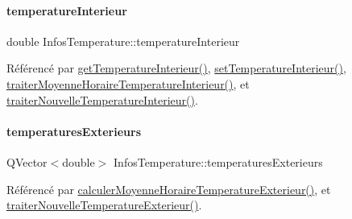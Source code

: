 \mbox{\label{class_infos_temperature_a976ab7ead7ac82b5b8572807d778689e}} 
\paragraph{\texorpdfstring{temperature\+Interieur}{temperatureInterieur}}
{\footnotesize\ttfamily double Infos\+Temperature\+::temperature\+Interieur\hspace{0.3cm}{\ttfamily [private]}}



Référencé par \hyperlink{class_infos_temperature_aaf4cb4fd8a7c46d14955d3175498f91c}{get\+Temperature\+Interieur()}, \hyperlink{class_infos_temperature_ac11ec6b1860f43dc989a02a7967497e7}{set\+Temperature\+Interieur()}, \hyperlink{class_infos_temperature_a0311c8ce5730388f3baef752920d5abf}{traiter\+Moyenne\+Horaire\+Temperature\+Interieur()}, et \hyperlink{class_infos_temperature_a547da18a7c04603d2f30eece061d9634}{traiter\+Nouvelle\+Temperature\+Interieur()}.

\mbox{\label{class_infos_temperature_a32b2a36e737ab4bf61fc8274990c2943}} 
\paragraph{\texorpdfstring{temperatures\+Exterieurs}{temperaturesExterieurs}}
{\footnotesize\ttfamily Q\+Vector$<$double$>$ Infos\+Temperature\+::temperatures\+Exterieurs\hspace{0.3cm}{\ttfamily [private]}}



Référencé par \hyperlink{class_infos_temperature_a437325028225d765780b884614c47077}{calculer\+Moyenne\+Horaire\+Temperature\+Exterieur()}, et \hyperlink{class_infos_temperature_ab8d95f48c31ca17c8690849562268420}{traiter\+Nouvelle\+Temperature\+Exterieur()}.

\mbox{\label{class_infos_temperature_a39a976c10811a7589e4aba42586813c5}} 
